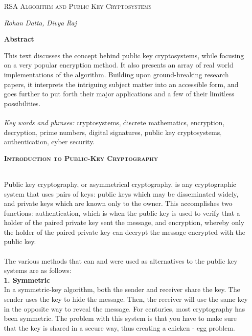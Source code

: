 \documentclass[12 pt]{article}
\begin{document}
\begin{titlepage}
\begin{Huge}
\begin{center}
\textsc{ RSA Algorithm \linebreak
and \linebreak
Public Key Cryptosystems}
\end{center}
\end{Huge}
\begin{center}
\begin{large}
\textsl{ Rohan Datta, Divya Raj}
\end{large}
\end{center}

\bigskip 
\begin{center}
\textbf{Abstract}
\end{center}
This text discusses the concept behind public key cryptosystems, while focusing on a very popular encryption method. It also presents an array of real world implementations of the algorithm.
Building upon ground-breaking research papers, it interprets the intriguing subject matter into an accessible form, and goes further to put forth their major applications and a few of their limitless possibilities.
\\
\\
\textit{Key words and phrases:} cryptosystems, discrete mathematics, encryption, decryption, prime numbers, digital signatures, public key cryptosystems, authentication, cyber security.
\end{titlepage}
\pagebreak
\begin{LARGE}	

\noindent \textbf{\textsc{Introduction to Public-Key Cryptography}}
\end{LARGE}

\noindent 
\\Public key cryptography, or asymmetrical cryptography, is any cryptographic system that uses pairs of keys: public keys which may be disseminated widely, and private keys which are known only to the owner. This accomplishes two functions: authentication, which is when the public key is used to verify that a holder of the paired private key sent the message, and encryption, whereby only the holder of the paired private key can decrypt the message encrypted with the public key.
\\\\The various methods that can and were used as alternatives to the public key systems are as follows:
\\\textbf{1. Symmetric}\\In a symmetric-key algorithm, both the sender and receiver share the key. The sender uses the key to hide the message. Then, the receiver will use the same key in the opposite way to reveal the message. For centuries, most cryptography has been symmetric. The problem with this system is that you have to make sure that the key is shared in a secure way, thus creating a chicken - egg problem.
\end{document}
